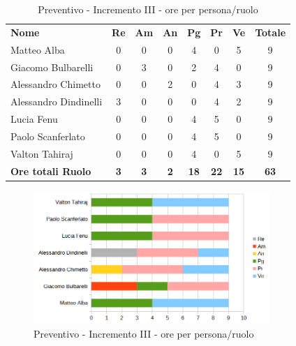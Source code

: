 	\begin{table} [h!]
	\begin{center}
		\begin{tabular} { m{3.5cm} c c c c c c c }
			\rowcolor{lightgray}
			\textbf{Nome} & \textbf{Re} & \textbf{Am} & \textbf{An} & \textbf{Pg} & \textbf{Pr} & \textbf{Ve} & \textbf{Totale} \\
			Matteo Alba & 0& 0& 0& 4& 0& 5& 9 \\
			Giacomo Bulbarelli & 0& 3& 0& 2& 4& 0& 9 \\
			Alessandro Chimetto & 0& 0& 2& 0& 4& 3& 9 \\
			Alessandro Dindinelli & 3& 0& 0& 0& 4&2 & 9 \\
			Lucia Fenu & 0& 0& 0& 4 & 5 & 0 & 9 \\
			Paolo Scanferlato &0 & 0& 0& 4 & 5 & 0 & 9 \\
			Valton Tahiraj & 0& 0&0 &4 & 0 & 5 & 9 \\
			\textbf{Ore totali Ruolo} & \textbf{3} & \textbf{3} & \textbf{2} & \textbf{18} & \textbf{22}& \textbf{15} & \textbf{63}
		\end{tabular}
		\caption{Preventivo - Incremento III - ore per persona/ruolo}
	\end{center}
\end{table}
\begin{figure} [h!]
	\centering
	\includegraphics[width=0.8\textwidth]{res/img/preventivi/3-barre.png}
	\caption{Preventivo - Incremento III - ore per persona/ruolo} 
\end{figure}

\newpage

